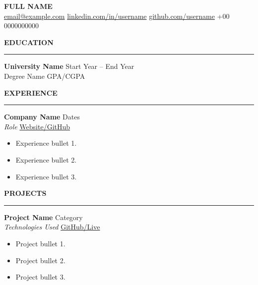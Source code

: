 \documentclass[10pt,a4paper]{article}
\newcommand{\sectionheading}[1]{%
    \vspace{6pt}
    {\large\textbf{#1}}
    \vspace{4pt}
    \hrule
    \vspace{4pt}
}
\begin{document}

\begin{center}
    {\LARGE\textbf{FULL NAME}}\\
    \href{mailto:email@example.com}{email@example.com} \quad
    \href{https://linkedin.com/in/username}{linkedin.com/in/username} \quad
    \href{https://github.com/username}{github.com/username} \quad
    +00 0000000000
\end{center}

\vspace{4pt}


\sectionheading{EDUCATION}

\textbf{University Name} \hfill Start Year -- End Year\\
Degree Name \hfill GPA/CGPA

\vspace{4pt}


\sectionheading{EXPERIENCE}

\textbf{Company Name} \hfill Dates\\
\textit{Role} \hfill
\href{https://link.com}{Website/GitHub}

\begin{itemize}[leftmargin=12pt,itemsep=2pt,topsep=2pt]
    \item Experience bullet 1.
    \item Experience bullet 2.
    \item Experience bullet 3.
\end{itemize}

\vspace{4pt}


\sectionheading{PROJECTS}

\textbf{Project Name} \hfill Category\\
\textit{Technologies Used} \hfill
\href{https://link.com}{GitHub/Live}

\begin{itemize}[leftmargin=12pt,itemsep=2pt,topsep=2pt]
    \item Project bullet 1.
    \item Project bullet 2.
    \item Project bullet 3.
\end{itemize}
\end{document}
